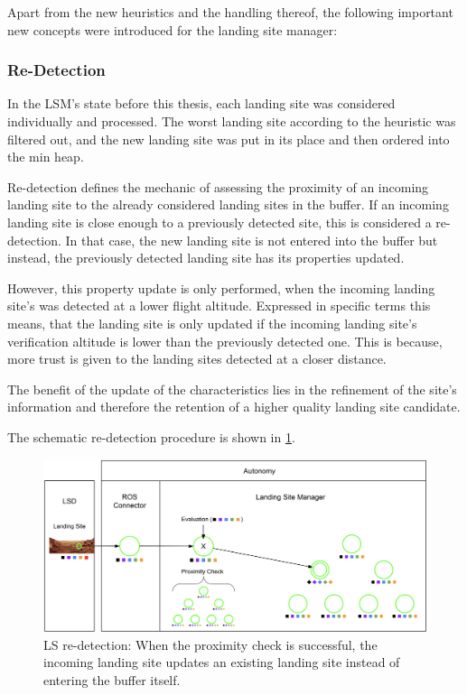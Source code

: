 Apart from the new heuristics and the handling thereof, the following important new concepts were introduced for the landing site manager:

\subsubsection{Re-Detection}\label{subsubsec:redetection}

In the LSM's state before this thesis, each landing site was considered individually and processed. The worst landing site according to the heuristic was filtered out, and the new landing site was put in its place and then ordered into the min heap.

Re-detection defines the mechanic of assessing the proximity of an incoming landing site to the already considered landing sites in the buffer. If an incoming landing site is close enough to a previously detected site, this is considered a re-detection. In that case, the new landing site is not entered into the buffer but instead, the previously detected landing site has its properties updated.

However, this property update is only performed, when the incoming landing site's was detected at a lower flight altitude. Expressed in specific terms this means, that the landing site is only updated if the incoming landing site's verification altitude is lower than the previously detected one. This is because, more trust is given to the landing sites detected at a closer distance. 

The benefit of the update of the characteristics lies in the refinement of the site's information and therefore the retention of a higher quality landing site candidate.

The schematic re-detection procedure is shown in \cref{fig:ls_redetection}.

\begin{figure}[h]
\centering
\includegraphics[scale=0.16]{images/autonomous_landing/re-detection.png}
\caption{LS re-detection: When the proximity check is successful, the incoming landing site updates an existing landing site instead of entering the buffer itself.}
\label{fig:ls_redetection}
\end{figure}


